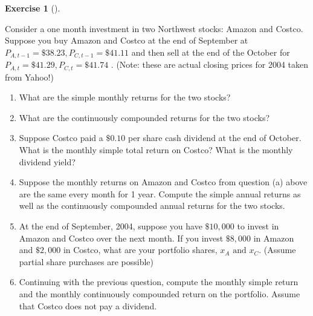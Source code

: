 \documentclass[
  letterpaper,
  DIV=11,
  numbers=noendperiod]{scrreprt}
\theoremstyle{definition}
\newtheorem{exercise}{Exercise}[chapter]
\theoremstyle{definition}
\theoremstyle{remark}
\begin{document}
\begin{exercise}[]\protect\hypertarget{exr-exercise0108}{}\label{exr-exercise0108}

Consider a one month investment in two Northwest stocks: Amazon and
Costco. Suppose you buy Amazon and Costco at the end of September at
\(P_{A,t-1} = \$38.23, P_{C,t-1} = \$41.11\) and then sell at the end of
the October for \(P_{A,t} = \$41.29, P_{C,t} = \$41.74\) . (Note: these
are actual closing prices for 2004 taken from Yahoo!)

\begin{enumerate}
\def\labelenumi{\arabic{enumi}.}
\item
  What are the simple monthly returns for the two stocks?
\item
  What are the continuously compounded returns for the two stocks?
\item
  Suppose Costco paid a \(\$0.10\) per share cash dividend at the end of
  October. What is the monthly simple total return on Costco? What is
  the monthly dividend yield?
\item
  Suppose the monthly returns on Amazon and Costco from question (a)
  above are the same every month for 1 year. Compute the simple annual
  returns as well as the continuously compounded annual returns for the
  two stocks.
\item
  At the end of September, 2004, suppose you have \(\$10,000\) to invest
  in Amazon and Costco over the next month. If you invest \(\$8,000\) in
  Amazon and \(\$2,000\) in Costco, what are your portfolio shares,
  \(x_A \text{ and } x_C\). (Assume partial share purchases are
  possible)
\item
  Continuing with the previous question, compute the monthly simple
  return and the monthly continuously compounded return on the
  portfolio. Assume that Costco does not pay a dividend.
\end{enumerate}

\end{exercise}
\end{document}
